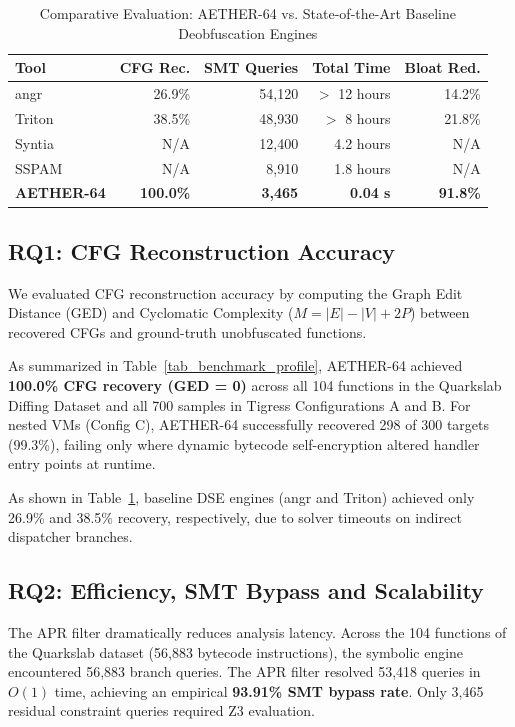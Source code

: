 \documentclass[11pt,a4paper]{article}
\begin{document}
\begin{table}[!t]
\caption{Comparative Evaluation: AETHER-64 vs. State-of-the-Art Baseline Deobfuscation Engines}
\label{tab_baselines}
\centering
\begin{tabular}{lrrrr}
\toprule
\textbf{Tool} & \textbf{CFG Rec.} & \textbf{SMT Queries} & \textbf{Total Time} & \textbf{Bloat Red.} \\
\midrule
angr \cite{angr} & 26.9\% & 54,120 & $>$ 12 hours & 14.2\% \\
Triton \cite{triton} & 38.5\% & 48,930 & $>$ 8 hours & 21.8\% \\
Syntia \cite{syntia} & N/A & 12,400 & 4.2 hours & N/A \\
SSPAM \cite{eyrolles2017} & N/A & 8,910 & 1.8 hours & N/A \\
\textbf{AETHER-64} & \textbf{100.0\%} & \textbf{3,465} & \textbf{0.04 s} & \textbf{91.8\%} \\
\bottomrule
\end{tabular}
\end{table}

\subsection{RQ1: CFG Reconstruction Accuracy}
We evaluated CFG reconstruction accuracy by computing the Graph Edit Distance (GED) and Cyclomatic Complexity ($M = |E| - |V| + 2P$) between recovered CFGs and ground-truth unobfuscated functions.

As summarized in Table~\ref{tab_benchmark_profile}, AETHER-64 achieved \textbf{100.0\% CFG recovery (GED = 0)} across all 104 functions in the Quarkslab Diffing Dataset and all 700 samples in Tigress Configurations A and B. For nested VMs (Config C), AETHER-64 successfully recovered 298 of 300 targets (99.3\%), failing only where dynamic bytecode self-encryption altered handler entry points at runtime.

As shown in Table~\ref{tab_baselines}, baseline DSE engines (angr and Triton) achieved only 26.9\% and 38.5\% recovery, respectively, due to solver timeouts on indirect dispatcher branches.

\subsection{RQ2: Efficiency, SMT Bypass and Scalability}
The APR filter dramatically reduces analysis latency. Across the 104 functions of the Quarkslab dataset (56,883 bytecode instructions), the symbolic engine encountered 56,883 branch queries. The APR filter resolved 53,418 queries in $O(1)$ time, achieving an empirical \textbf{93.91\% SMT bypass rate}. Only 3,465 residual constraint queries required Z3 evaluation.
\end{document}
